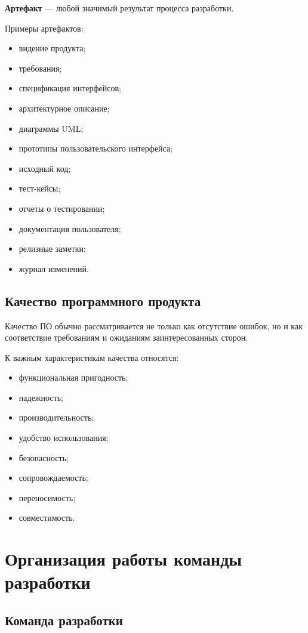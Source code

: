 \documentclass[12pt,a4paper]{article}
\begin{document}
\textbf{Артефакт} --- любой значимый результат процесса разработки.

Примеры артефактов:
\begin{itemize}
    \item видение продукта;
    \item требования;
    \item спецификация интерфейсов;
    \item архитектурное описание;
    \item диаграммы UML;
    \item прототипы пользовательского интерфейса;
    \item исходный код;
    \item тест-кейсы;
    \item отчеты о тестировании;
    \item документация пользователя;
    \item релизные заметки;
    \item журнал изменений.
\end{itemize}

\subsection{Качество программного продукта}

Качество ПО обычно рассматривается не только как отсутствие ошибок, но и как соответствие требованиям и ожиданиям заинтересованных сторон.

К важным характеристикам качества относятся:
\begin{itemize}
    \item функциональная пригодность;
    \item надежность;
    \item производительность;
    \item удобство использования;
    \item безопасность;
    \item сопровождаемость;
    \item переносимость;
    \item совместимость.
\end{itemize}

\section{Организация работы команды разработки}

\subsection{Команда разработки}
\end{document}
